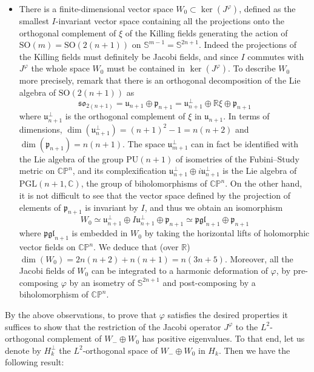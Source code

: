 \documentclass{article}
\numberwithin{equation}{section}        %
\theoremstyle{bfnote}
\theoremstyle{definition}
\theoremstyle{bfremark}
\newcommand{\R}{\mathbb{R}}                 %
\newcommand{\C}{\mathbb{C}}                 %
\renewcommand{\P}{\mathbb{P}}               %
\newcommand{\Sp}{\mathbb{S}}                %
\begin{document}
\begin{itemize}
    \item There is a finite-dimensional vector space $W_0 \subset \ker(J^\varphi)$, defined as the smallest $I$-invariant vector space containing all the projections onto the orthogonal complement of $\xi$ of the Killing fields generating the action of $\mathrm{SO}(m) = \mathrm{SO}(2(n+1))$ on $\Sp^{m-1} = \Sp^{2n+1}$. Indeed the projections of the Killing fields must definitely be Jacobi fields, and since $I$ commutes with $J^\varphi$ the whole space $W_0$ must be contained in $\ker(J^\varphi)$. To describe $W_0$ more precisely, remark that there is an orthogonal decomposition of the Lie algebra of $\mathrm{SO}(2(n+1))$ as
    \begin{equation*}
        \mathfrak{so}_{2(n+1)} = \mathfrak{u}_{n+1} \oplus \mathfrak{p}_{n+1} = \mathfrak{u}^\perp_{n+1} \oplus \R\xi \mathfrak{} \oplus \mathfrak{p}_{n+1}
    \end{equation*}
    where $\mathfrak{u}^\perp_{n+1}$ is the orthogonal complement of $\xi$ in $\mathfrak{u}_{n+1}$. In terms of dimensions, $\dim(\mathfrak{u}^\perp_{n+1}) = (n+1)^2-1 = n(n+2)$ and $\dim(\mathfrak{p}_{n+1}) = n(n+1)$. The space $\mathfrak{u}^\perp_{m+1}$ can in fact be identified with the Lie algebra of the group $\mathrm{PU}(n+1)$ of isometries of the Fubini--Study metric on $\C\P^n$, and its complexification $\mathfrak{u}^\perp_{n+1} \oplus i \mathfrak{u}^\perp_{n+1}$ is the Lie algebra of $\mathrm{PGL}(n+1,\C)$, the group of biholomorphisms of $\C\P^n$. On the other hand, it is not difficult to see that the vector space defined by the projection of elements of $\mathfrak{p}_{n+1}$ is invariant by $I$, and thus we obtain an isomorphism
    \begin{equation*}
        W_0 \simeq \mathfrak{u}^\perp_{n+1} \oplus I \mathfrak{u}^\perp_{n+1} \oplus \mathfrak{p}_{n+1} \simeq \mathfrak{pgl}_{n+1} \oplus \mathfrak{p}_{n+1}
    \end{equation*}
    where $\mathfrak{pgl}_{n+1}$ is embedded in $W_0$ by taking the horizontal lifts of holomorphic vector fields on $\C\P^n$. We deduce that (over $\R$) $\dim(W_0) = 2n(n+2) + n(n+1) = n(3n+5)$. Moreover, all the Jacobi fields of $W_0$ can be integrated to a harmonic deformation of $\varphi$, by pre-composing $\varphi$ by an isometry of $\Sp^{2n+1}$ and post-composing by a biholomorphism of $\C\P^n$.
\end{itemize}
By the above observations, to prove that $\varphi$ satisfies the desired properties it suffices to show that the restriction of the Jacobi operator $J^\varphi$ to the $L^2$-orthogonal complement of $W_- \oplus W_0$ has positive eigenvalues. To that end, let us denote by $H_k^\perp$ the $L^2$-orthogonal space of $W_- \oplus W_0$ in $H_k$. Then we have the following result:
\end{document}
